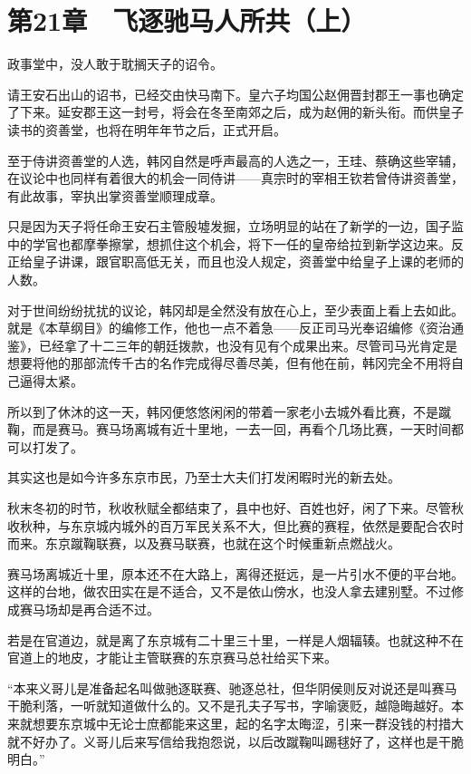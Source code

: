 \section{第21章　飞逐驰马人所共（上）}

政事堂中，没人敢于耽搁天子的诏令。

请王安石出山的诏书，已经交由快马南下。皇六子均国公赵佣晋封郡王一事也确定了下来。延安郡王这一封号，将会在冬至南郊之后，成为赵佣的新头衔。而供皇子读书的资善堂，也将在明年年节之后，正式开启。

至于侍讲资善堂的人选，韩冈自然是呼声最高的人选之一，王珪、蔡确这些宰辅，在议论中也同样有着很大的机会一同侍讲——真宗时的宰相王钦若曾侍讲资善堂，有此故事，宰执出掌资善堂顺理成章。

只是因为天子将任命王安石主管殷墟发掘，立场明显的站在了新学的一边，国子监中的学官也都摩拳擦掌，想抓住这个机会，将下一任的皇帝给拉到新学这边来。反正给皇子讲课，跟官职高低无关，而且也没人规定，资善堂中给皇子上课的老师的人数。

对于世间纷纷扰扰的议论，韩冈却是全然没有放在心上，至少表面上看上去如此。就是《本草纲目》的编修工作，他也一点不着急——反正司马光奉诏编修《资治通鉴》，已经拿了十二三年的朝廷拨款，也没有见有个成果出来。尽管司马光肯定是想要将他的那部流传千古的名作完成得尽善尽美，但有他在前，韩冈完全不用将自己逼得太紧。

所以到了休沐的这一天，韩冈便悠悠闲闲的带着一家老小去城外看比赛，不是蹴鞠，而是赛马。赛马场离城有近十里地，一去一回，再看个几场比赛，一天时间都可以打发了。

其实这也是如今许多东京市民，乃至士大夫们打发闲暇时光的新去处。

秋末冬初的时节，秋收秋赋全都结束了，县中也好、百姓也好，闲了下来。尽管秋收秋种，与东京城内城外的百万军民关系不大，但比赛的赛程，依然是要配合农时而来。东京蹴鞠联赛，以及赛马联赛，也就在这个时候重新点燃战火。

赛马场离城近十里，原本还不在大路上，离得还挺远，是一片引水不便的平台地。这样的台地，做农田实在是不适合，又不是依山傍水，也没人拿去建别墅。不过修成赛马场却是再合适不过。

若是在官道边，就是离了东京城有二十里三十里，一样是人烟辐辏。也就这种不在官道上的地皮，才能让主管联赛的东京赛马总社给买下来。

“本来义哥儿是准备起名叫做驰逐联赛、驰逐总社，但华阴侯则反对说还是叫赛马干脆利落，一听就知道做什么的。又不是孔夫子写书，字喻褒贬，越隐晦越好。本来就想要东京城中无论士庶都能来这里，起的名字太晦涩，引来一群没钱的村措大就不好办了。义哥儿后来写信给我抱怨说，以后改蹴鞠叫踢毬好了，这样也是干脆明白。”

